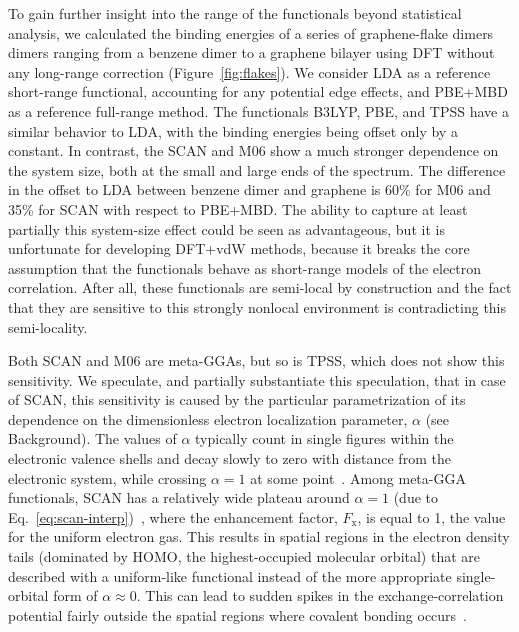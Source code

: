 To gain further insight into the range of the functionals beyond statistical analysis, we calculated the binding energies of a series of graphene-flake dimers dimers ranging from a benzene dimer to a graphene bilayer using DFT without any long-range correction (Figure~\ref{fig:flakes}).
We consider LDA as a reference short-range functional, accounting for any potential edge effects, and PBE+MBD as a reference full-range method.
The functionals B3LYP, PBE, and TPSS have a similar behavior to LDA, with the binding energies being offset only by a constant.
In contrast, the SCAN and M06 show a much stronger dependence on the system size, both at the small and large ends of the spectrum.
The difference in the offset to LDA between benzene dimer and graphene is 60\% for M06 and 35\% for SCAN with respect to PBE+MBD\@.
The ability to capture at least partially this system-size effect could be seen as advantageous, but it is unfortunate for developing DFT+vdW methods, because it breaks the core assumption that the functionals behave as short-range models of the electron correlation.
After all, these functionals are semi-local by construction and the fact that they are sensitive to this strongly nonlocal environment is contradicting this semi-locality.

Both SCAN and M06 are meta-GGAs, but so is TPSS, which does not show this sensitivity.
We speculate, and partially substantiate this speculation, that in case of SCAN, this sensitivity is caused by the particular parametrization of its dependence on the dimensionless electron localization parameter, $\alpha$ (see Background).
The values of $\alpha$ typically count in single figures within the electronic valence shells and decay slowly to zero with distance from the electronic system, while crossing $\alpha=1$ at some point~\cite{SunPRL13,BeckeJCP90}.
Among meta-GGA functionals, SCAN has a relatively wide plateau around $\alpha=1$ (due to Eq.~\ref{eq:scan-interp})~\cite{LoosJCP17}, where the enhancement factor, $F_\mathrm x$, is equal to 1, the value for the uniform electron gas.
This results in spatial regions in the electron density tails (dominated by HOMO, the highest-occupied molecular orbital) that are described with a uniform-like functional instead of the more appropriate single-orbital form of $\alpha\approx0$.
This can lead to sudden spikes in the exchange-correlation potential fairly outside the spatial regions where covalent bonding occurs~\cite{Gerit-private}.

